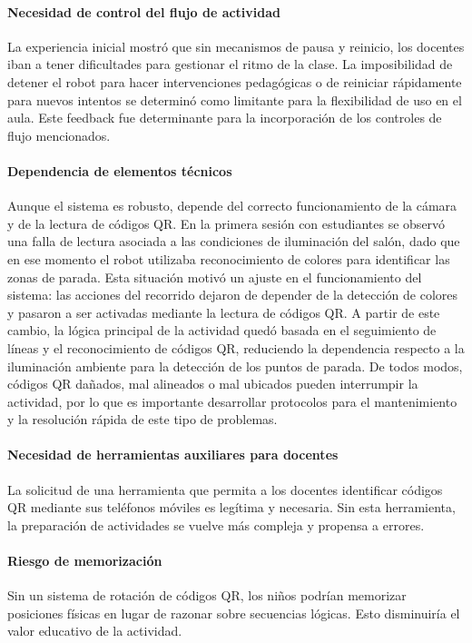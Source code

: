 \documentclass{prgrado}
\begin{document}
\paragraph{Necesidad de control del flujo de actividad} La experiencia inicial mostró que sin mecanismos de pausa y reinicio, los docentes iban a tener dificultades para gestionar el ritmo de la clase. La imposibilidad de detener el robot para hacer intervenciones pedagógicas o de reiniciar rápidamente para nuevos intentos se determinó como limitante para la flexibilidad de uso en el aula. Este feedback fue determinante para la incorporación de los controles de flujo mencionados.
\paragraph{Dependencia de elementos técnicos} Aunque el sistema es robusto, depende del correcto funcionamiento de la cámara y de la lectura de códigos QR. En la primera sesión con estudiantes se observó una falla de lectura asociada a las condiciones de iluminación del salón, dado que en ese momento el robot utilizaba reconocimiento de colores para identificar las zonas de parada. Esta situación motivó un ajuste en el funcionamiento del sistema: las acciones del recorrido dejaron de depender de la detección de colores y pasaron a ser activadas mediante la lectura de códigos QR. A partir de este cambio, la lógica principal de la actividad quedó basada en el seguimiento de líneas y el reconocimiento de códigos QR, reduciendo la dependencia respecto a la iluminación ambiente para la detección de los puntos de parada. De todos modos, códigos QR dañados, mal alineados o mal ubicados pueden interrumpir la actividad, por lo que es importante desarrollar protocolos para el mantenimiento y la resolución rápida de este tipo de problemas.
\paragraph{Necesidad de herramientas auxiliares para docentes} La solicitud de una herramienta que permita a los docentes identificar códigos QR mediante sus teléfonos móviles es legítima y necesaria. Sin esta herramienta, la preparación de actividades se vuelve más compleja y propensa a errores.
\paragraph{Riesgo de memorización} Sin un sistema de rotación de códigos QR, los niños podrían memorizar posiciones físicas en lugar de razonar sobre secuencias lógicas. Esto disminuiría el valor educativo de la actividad.
\end{document}
